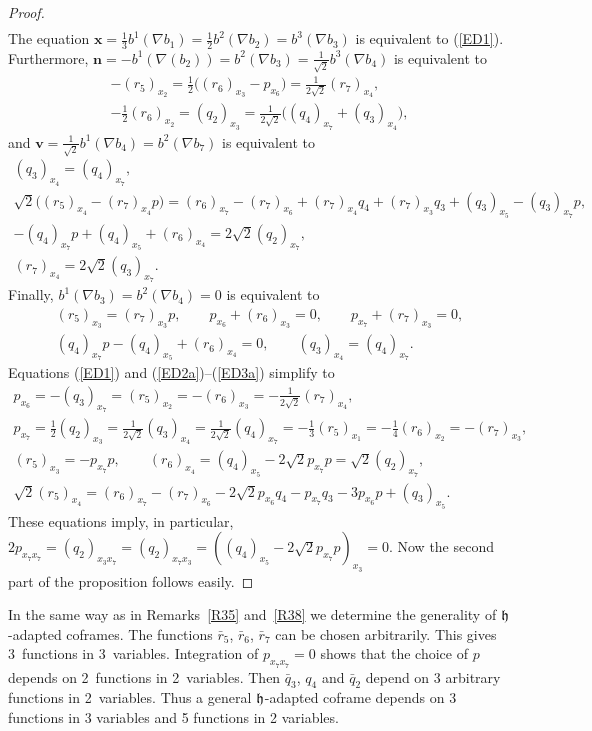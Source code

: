 \documentclass[11pt]{article}
\numberwithin{equation}{section}
\newcommand\fh{{\frak h}}
\newcommand\bx{{\mathbf x}}
\newcommand\bn{{\mathbf n}}
\newcommand\bv{{\mathbf v}}
\begin{document}
\begin{proof}
\begin{gather*}
\end{gather*}
The equation $\bx=\frac13 b^1(\nabla b_1)=\frac12 b^2(\nabla b_2)=b^3(\nabla b_3)$ is equivalent to (\ref{ED1}). Furthermore,
$\bn=-b^1(\nabla(b_2))=b^2(\nabla b_3)=\frac1{\sqrt 2} b^3(\nabla b_4)$ is equivalent to
\begin{gather}
 -(r_5)_{x_2} =\tfrac12 \big((r_6)_{x_3}-p_{x_6}\big)=\tfrac1{2\sqrt 2} (r_7)_{x_4},\label{ED2a}\\
- \tfrac12 (r_6)_{x_2} =(q_2)_{x_3} =\tfrac1{2\sqrt 2}\big((q_4)_{x_7}+(q_3)_{x_4}\big),
\end{gather}
and $\bv=\frac1{\sqrt2} b^1(\nabla b_4)=b^2(\nabla b_7)$ is equivalent to
\begin{gather}
(q_3)_{x_4}=(q_4)_{x_7},\\
\sqrt2\big((r_5)_{x_4}-(r_7)_{x_4}p\big)=(r_6)_{x_7} -(r_7)_{x_6}+(r_7)_{x_4}q_4+(r_7)_{x_3}q_3+(q_3)_{x_5}-(q_3)_{x_7}p,\\
-(q_4)_{x_7}p+(q_4)_{x_5}+(r_6)_{x_4} = 2\sqrt2 (q_2)_{x_7}, \\
(r_7)_{x_4} = 2\sqrt2 (q_3)_{x_7}.
\end{gather}
Finally, $ b^1(\nabla b_3) =b^2(\nabla b_4 )=0$ is equivalent to
\begin{gather}
(r_5)_{x_3}=(r_7)_{x_3 }p,\qquad p_{x_6}+(r_6)_{x_3}=0,\qquad p_{x_7}+(r_7)_{x_3}=0, \\
(q_4)_{x_7}p-(q_4)_{x_5}+(r_6)_{x_4}=0, \qquad (q_3)_{x_4}=(q_4)_{x_7} . \label{ED3a}
 \end{gather}
Equations (\ref{ED1}) and (\ref{ED2a})--(\ref{ED3a}) simplify to
\begin{gather*}
p_{x_6}=-(q_3)_{x_7}=(r_5)_{x_2}=-(r_6)_{x_3}=- \tfrac1{2\sqrt2} (r_7)_{x_4},\\
p_{x_7}= \tfrac 12 (q_2)_{x_3}=\tfrac1{2\sqrt2}(q_3)_{x_4}=\tfrac1{2\sqrt2}(q_4)_{x_7}=-\tfrac13(r_5)_{x_1}=-\tfrac14(r_6)_{x_2}=-(r_7)_{x_3},\\
(r_5)_{x_3}=- p_{x_7}p,\qquad
(r_6)_{x_4}=(q_4)_{x_5}-2\sqrt2 p_{x_7}p=\sqrt2 (q_2)_{x_7},\\
\sqrt2 (r_5)_{x_4}=(r_6)_{x_7}-(r_7)_{x_6}-2\sqrt2 p_{x_6}q_4-p_{x_7}q_3-3p_{x_6}p+(q_3)_{x_5}.
\end{gather*}
These equations imply, in particular, $2p_{x_7 x_7}=(q_2)_{x_3 x_7}=(q_2)_{x_7 x_3}=((q_4)_{x_5}-2\sqrt2 p_{x_7}p)_{x_3}=0$. Now the second part of the proposition follows easily.
\end{proof}
\begin{Remark} In the same way as in Remarks~\ref{R35} and~\ref{R38} we determine the generality of $\fh$-adapted coframes. The functions $ \bar r_5$, $\bar r_6$, $\bar r_7$ can be chosen arbitrarily. This gives 3~functions in 3~variables. Integration of $p_{x_7 x_7}=0$ shows that the choice of $p$ depends on 2~functions in 2~variables. Then $\bar q_3$, $q_4$ and $\bar q_2$ depend on 3 arbitrary functions in 2~variables. Thus a general $\fh$-adapted coframe depends on 3 functions in 3 variables and 5 functions in 2 variables.
\end{Remark}
\end{document}
